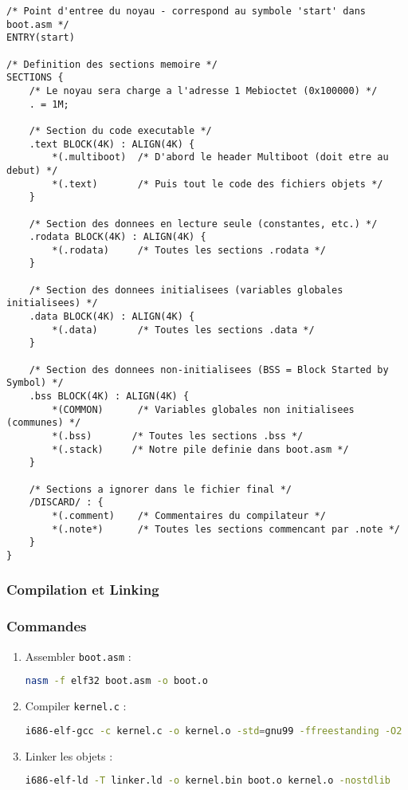 \documentclass{article}
\begin{document}
\begin{lstlisting}[language=ld]
    /* Point d'entree du noyau - correspond au symbole 'start' dans boot.asm */
ENTRY(start)

/* Definition des sections memoire */
SECTIONS {
    /* Le noyau sera charge a l'adresse 1 Mebioctet (0x100000) */
    . = 1M;

    /* Section du code executable */
    .text BLOCK(4K) : ALIGN(4K) {
        *(.multiboot)  /* D'abord le header Multiboot (doit etre au debut) */
        *(.text)       /* Puis tout le code des fichiers objets */
    }

    /* Section des donnees en lecture seule (constantes, etc.) */
    .rodata BLOCK(4K) : ALIGN(4K) {
        *(.rodata)     /* Toutes les sections .rodata */
    }

    /* Section des donnees initialisees (variables globales initialisees) */
    .data BLOCK(4K) : ALIGN(4K) {
        *(.data)       /* Toutes les sections .data */
    }

    /* Section des donnees non-initialisees (BSS = Block Started by Symbol) */
    .bss BLOCK(4K) : ALIGN(4K) {
        *(COMMON)      /* Variables globales non initialisees (communes) */
        *(.bss)       /* Toutes les sections .bss */
        *(.stack)     /* Notre pile definie dans boot.asm */
    }

    /* Sections a ignorer dans le fichier final */
    /DISCARD/ : {
        *(.comment)    /* Commentaires du compilateur */
        *(.note*)      /* Toutes les sections commencant par .note */
    }
}
\end{lstlisting}

\subsubsection*{Compilation et Linking}
\subsubsection*{Commandes}
\begin{enumerate}
    \item Assembler \texttt{boot.asm} :
    \begin{lstlisting}[language=bash]
    nasm -f elf32 boot.asm -o boot.o
    \end{lstlisting}
    
    \item Compiler \texttt{kernel.c} :
    \begin{lstlisting}[language=bash]
    i686-elf-gcc -c kernel.c -o kernel.o -std=gnu99 -ffreestanding -O2 -Wall -Wextra
    \end{lstlisting}
    
    \item Linker les objets :
    \begin{lstlisting}[language=bash]
    i686-elf-ld -T linker.ld -o kernel.bin boot.o kernel.o -nostdlib
    \end{lstlisting}
\end{enumerate}
\end{document}
